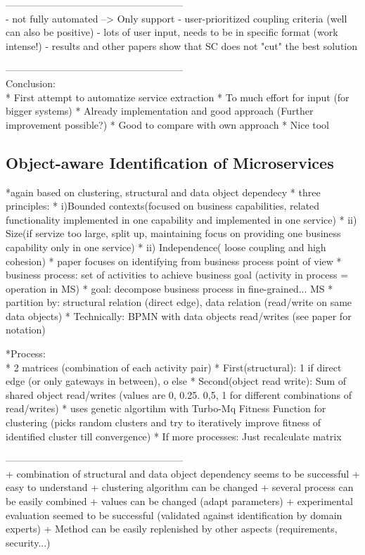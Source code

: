 ------------------------------------------------------\\

- not fully automated --> Only support
- user-prioritized coupling criteria (well can also be positive)
- lots of user input, needs to be in specific format (work intense!)
- results and other papers show that SC does not "cut" the best solution

------------------------------------------------------\\
Conclusion:\\
* First attempt to automatize service extraction
* To much effort for input (for bigger systems)
* Already implementation and good approach (Further improvement possible?)
* Good to compare with own approach
* Nice tool


\subsection{Object-aware Identification of Microservices}

*again based on clustering, structural and data object dependecy
* three principles: 
* i)Bounded contexts(focused on business capabilities, related functionality implemented in one capability and implemented in one service)
* ii)  Size(if servize too large, split up, maintaining focus on providing one business capability only in one service)
* ii) Independence( loose coupling and high cohesion)
* paper focuses on identifying from business process point of view
* business process: set of activities to achieve business goal (activity in process = operation in MS)
* goal: decompose business process in fine-grained... MS
* partition by: structural relation (direct edge), data relation (read/write on same data objects)
* Technically: BPMN with data objects read/writes (see paper for notation)

*Process:\\
* 2 matrices  (combination of each activity pair)
* First(structural): 1 if direct edge (or only gateways in between), o else
* Second(object read write): Sum of shared object read/writes (values are 0, 0.25. 0,5, 1 for different combinations of read/writes)
* uses genetic algortihm with Turbo-Mq Fitness Function for clustering (picks random clusters and try to iteratively improve fitness of identified cluster till convergence)
* If more processes: Just recalculate matrix 

------------------------------------------------------\\
+ combination of structural and data object dependency seems to be successful  
+ easy to understand
+ clustering algorithm can be changed
+ several process can be easily combined
+ values can be changed (adapt parameters)
+ experimental evaluation seemed to be successful (validated against identification by domain experts)
+ Method can be easily replenished by other aspects (requirements, security...)



